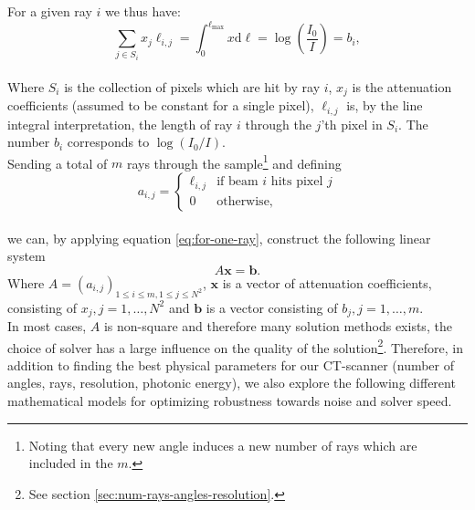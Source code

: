 \documentclass{article}
\begin{document}
For a given ray $i$ we thus have: \\
\begin{equation}\label{eq:for-one-ray}
    \sum_{j \in S_i} x_j \ell_{i, j} = \int_{0}^{\ell_{\max}}x \text{d} \ell = \log\left(\frac{I_0}{I}\right) = b_i,
\end{equation} \\
Where $S_i$ is the collection of pixels which are hit by ray $i$, $x_j$ is the attenuation coefficients (assumed to be constant for a single pixel), $\ell_{i, j}$ is, by the line integral interpretation, the length of ray $i$ through the $j$'th pixel in $S_i$. The number $b_i$ corresponds to $\log{(I_0 / I)}$. \\
Sending a total of $m$ rays through the sample\footnote{Noting that every new angle induces a new number of rays which are included in the $m$.}  and defining \\
\begin{equation}
    a_{i, j} = 
    \begin{cases}
        \ell_{i, j} & \text{if beam $i$ hits pixel $j$} \\
        0 & \text{otherwise,}
    \end{cases}
\end{equation} \\
we can, by applying equation \ref{eq:for-one-ray}, construct the following linear system
\begin{equation}
    A \boldsymbol{x} = \boldsymbol{b}. \label{eq:main}
\end{equation} 
\noindent Where $A = (a_{i,j})_{1 \leq i \leq m, 1 \leq j \leq N^2}$, $\boldsymbol{x}$ is a vector of attenuation coefficients, consisting of $x_j, j = 1, \dots, N^2$ and $\boldsymbol{b}$ is a vector consisting of $b_j, j = 1, \dots, m$. \\
In most cases, $A$ is non-square and therefore many solution methods exists, the choice of solver has a large influence on the quality of the solution\footnote{See section \ref{sec:num-rays-angles-resolution}.}. Therefore, in addition to finding the best physical parameters for our CT-scanner (number of angles, rays, resolution, photonic energy), we also explore the following different mathematical models for optimizing robustness towards noise and solver speed.
\end{document}
